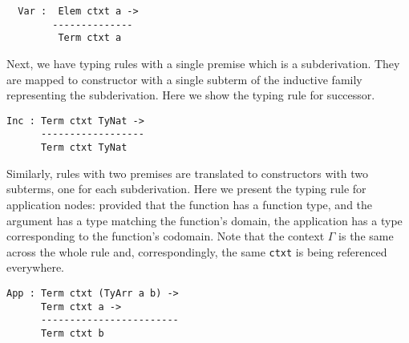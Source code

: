 \begin{center}
\begin{minipage}{0.45\textwidth}
\inferenceVar
\end{minipage}\hfill
\begin{minipage}{0.45\textwidth}
\begin{Verbatim}
  Var :  Elem ctxt a ->
        --------------
         Term ctxt a
\end{Verbatim}
\end{minipage}
\end{center}

Next, we have typing rules with a single premise which is a subderivation.
They are mapped to constructor with a single subterm of the inductive family
representing the subderivation.
%
Here we show the typing rule for successor.

\begin{center}
  \begin{minipage}{0.45\textwidth}
    \inferenceInc
  \end{minipage}\hfill
  \begin{minipage}{0.45\textwidth}
    \begin{Verbatim}
Inc : Term ctxt TyNat ->
      ------------------
      Term ctxt TyNat
    \end{Verbatim}
  \end{minipage}
\end{center}

Similarly, rules with two premises are translated to constructors
with two subterms, one for each subderivation.
%
Here we present the typing rule for application nodes: provided that
the function has a function type, and the argument has a type matching
the function's domain, the application has a type corresponding to the
function's codomain.
Note that the context $\Gamma$ is the same across the whole rule and,
correspondingly, the same \texttt{ctxt} is being referenced everywhere.

\begin{center}
  \begin{minipage}{0.35\textwidth}
    \inferenceApp
  \end{minipage}\hfill
  \begin{minipage}{0.55\textwidth}
    \begin{Verbatim}
App : Term ctxt (TyArr a b) ->
      Term ctxt a ->
      ------------------------
      Term ctxt b
    \end{Verbatim}
  \end{minipage}
\end{center}

